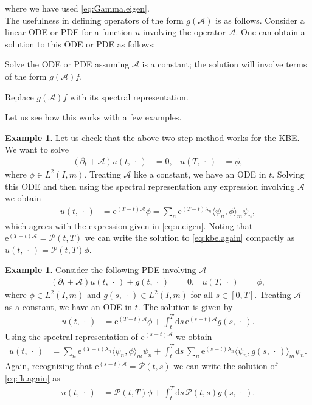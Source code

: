 \documentclass[12pt]{book}
\let\varphi\phi
\numberwithin{equation}{chapter}
\theoremstyle{plain}
\numberwithin{theorem}{section}
\theoremstyle{definition}
\newtheorem{example}[theorem]{\underline{Example}}
\numberwithin{exercise}{chapter}
\newcommand{\<}{\langle}
\renewcommand{\>}{\rangle}
\renewcommand{\(}{\left(}
\renewcommand{\)}{\right)}
\renewcommand{\[}{\left[}
\renewcommand{\]}{\right]}
\newcommand\Ac{\mathscr{A}}
\newcommand\Pc{\mathscr{P}}
\newcommand\lam{\lambda}
\renewcommand\d{\partial}
\newcommand\dd{\mathrm{d}}
\newcommand\ee{\mathrm{e}}
\begin{document}
where we have used \eqref{eq:Gamma.eigen}.
\\[0.5em]
The usefulness in defining operators of the form $g(\Ac)$ is as follows.  Consider a linear ODE or PDE for a function $u$ involving the operator $\Ac$.  One can obtain a solution to this ODE or PDE as follows:
\begin{enumerate*}
\item Solve the ODE or PDE assuming $\Ac$ is a constant; the solution will involve terms of the form $g(\Ac)f$.
\item Replace $g(\Ac)f$ with its spectral representation.
\end{enumerate*}
Let us see how this works with a few examples.

\begin{example}
Let us check that the above two-step method works for the KBE.  We want to solve
\begin{align}
(\d_t + \Ac)u(t,\, \cdot \,)
	&=	0 , &
u(T,\, \cdot \,)
	&= \varphi , \label{eq:kbe.again}
\end{align}
where $\varphi \in L^2(I,m)$.
Treating $\Ac$ like a constant, we have an ODE in $t$.  Solving this ODE and then using the spectral representation any expression involving $\Ac$ we obtain
\begin{align}
u(t,\, \cdot \,)
	&=	\ee^{(T-t)\Ac} \varphi
	=		\sum_n \ee^{(T-t)\lam_n} \< \psi_n, \varphi\>_m \psi_n ,
\end{align}
which agrees with the expression given in \eqref{eq:u.eigen}.  Noting that $\ee^{(T-t)\Ac} = \Pc(t,T)$ we can write the solution to \eqref{eq:kbe.again} compactly as
$u(t,\, \cdot \,) = \Pc(t,T)\varphi$.
\end{example}

\begin{example}
Consider the following PDE involving $\Ac$
\begin{align}
(\d_t + \Ac) u(t,\, \cdot \,) + g(t,\, \cdot \,)
	&=	0 , &
u(T,\, \cdot \,)
	&=	\varphi , \label{eq:fk.again}
\end{align}
where $\varphi \in L^2(I,m)$ and $g(s,\, \cdot \,)\in L^2(I,m)$ for all $s \in [0,T]$.
Treating $\Ac$ as a constant, we have an ODE in $t$.  The solution is given by
\begin{align}
u(t,\, \cdot \,)
	&=	\ee^{(T-t)\Ac} \varphi + \int_t^T \dd s \, \ee^{(s-t)\Ac} g(s,\, \cdot \,) .
\end{align}
Using the spectral representation of $\ee^{(s-t)\Ac}$ we obtain
\begin{align}
u(t,\, \cdot \,)
	&=	\sum_n \ee^{(T-t)\lam_n} \< \psi_n, \varphi\>_m \psi_n + \int_t^T \dd s \, \sum_n \ee^{(s-t)\lam_n} \< \psi_n, g(s,\, \cdot \,) \>_m \psi_n .
\end{align}
Again, recognizing that $\ee^{(s-t)\Ac} = \Pc(t,s)$ we can write the solution of \eqref{eq:fk.again} as
\begin{align}
u(t,\, \cdot \,)
	&=	\Pc(t,T) \varphi + \int_t^T \dd s \, \Pc(t,s) g(s,\, \cdot \,) .
\end{align}
\end{example}
\end{document}
